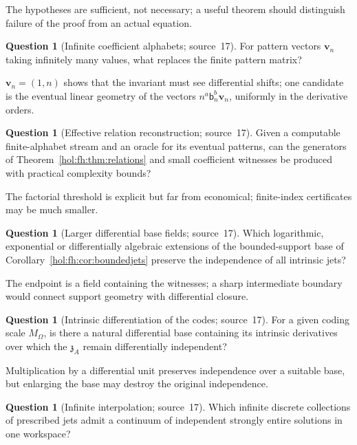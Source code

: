 \documentclass[11pt]{article}
\numberwithin{equation}{section}
\theoremstyle{definition}
\newtheorem{question}[theorem]{Question}
\theoremstyle{remark}
\begin{document}
The hypotheses are sufficient, not necessary; a useful theorem should
distinguish failure of the proof from an actual equation.

\begin{question}[Infinite coefficient alphabets; source~17]
\label{hol:fh:q:alphabets}
For pattern vectors $\mathbf v_n$ taking infinitely many values, what replaces
the finite pattern matrix?
\end{question}

$\mathbf v_n=(1,n)$ shows that the invariant must see differential shifts; one
candidate is the eventual linear geometry of the vectors
$n^a\mathsf b_n^b\mathbf v_n$, uniformly in the derivative orders.

\begin{question}[Effective relation reconstruction; source~17]
\label{hol:fh:q:effective}
Given a computable finite-alphabet stream and an oracle for its eventual
patterns, can the generators of Theorem~\ref{hol:fh:thm:relations} and small
coefficient witnesses be produced with practical complexity bounds?
\end{question}

The factorial threshold is explicit but far from economical; finite-index
certificates may be much smaller.

\begin{question}[Larger differential base fields; source~17]
\label{hol:fh:q:bases}
Which logarithmic, exponential or differentially algebraic extensions of the
bounded-support base of Corollary~\ref{hol:fh:cor:boundedjets} preserve the
independence of all intrinsic jets?
\end{question}

The endpoint is a field containing the witnesses; a sharp intermediate
boundary would connect support geometry with differential closure.

\begin{question}[Intrinsic differentiation of the codes; source~17]
\label{hol:fh:q:codes}
For a given coding scale $M_\Omega$, is there a natural differential base
containing its intrinsic derivatives over which the $\mathfrak z_A$ remain
differentially independent?
\end{question}

Multiplication by a differential unit preserves independence over a suitable
base, but enlarging the base may destroy the original independence.

\begin{question}[Infinite interpolation; source~17]\label{hol:fh:q:interpolation}
Which infinite discrete collections of prescribed jets admit a continuum of
independent strongly entire solutions in one workspace?
\end{question}
\end{document}
